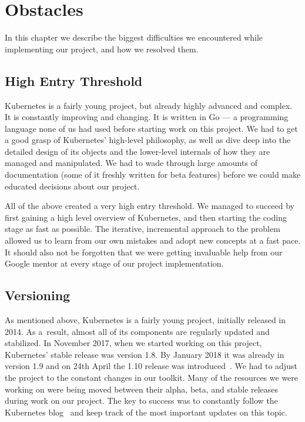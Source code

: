 \chapter{Obstacles}
In this chapter we describe the biggest difficulties we encountered while implementing our project,
and how we resolved them.

\section{High Entry Threshold}
Kubernetes is a fairly young project, but already highly advanced and complex. It is constantly
improving and changing. It is written in Go --- a programming language none of
us had used before starting work on this project. We had to get a good grasp of Kubernetes’
high-level philosophy, as well as dive deep into the detailed design of its objects and the
lower-level internals of how they are managed and manipulated. We had to wade through large amounts
of documentation (some of it freshly written for beta features) before we could make educated
decisions about our project.

All of the above created a very high entry threshold. We managed to succeed by
first gaining a high level overview of Kubernetes, and then starting the coding stage as fast as
possible. The iterative, incremental approach to the problem allowed us to learn from our own mistakes
and adopt new concepts at a fast pace. It should also not be forgotten that we were getting
invaluable help from our Google mentor at every stage of our project implementation.

\section{Versioning}
As mentioned above, Kubernetes is a fairly young project, initially released in 2014. As a~result,
almost all of its components are regularly updated and stabilized. In November 2017, when we
started working on this project, Kubernetes' stable release was version 1.8. By January 2018 it was
already in version 1.9 and on 24th April the 1.10 release was introduced~\cite{releases}. We had to adjust the
project to the constant changes in our toolkit. Many of the resources we were working on were
being moved between their alpha, beta, and stable releases during work on our project. The key to
success was to constantly follow the Kubernetes blog~\cite{blog} and keep track of the most important updates
on this topic.


